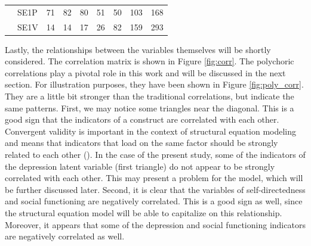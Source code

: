 \documentclass[11pt]{article}
\begin{document}
\begin{table}[h!]
{\begin{tabular}{|l|l|lllllll|}
                                    & SE1P                           & \multicolumn{1}{l|}{71}         & \multicolumn{1}{l|}{82}         & \multicolumn{1}{l|}{80}         & \multicolumn{1}{l|}{51}         & \multicolumn{1}{l|}{50}         & \multicolumn{1}{l|}{103}       & 168       \\ \cline{2-9} 
                                    & SE1V                           & \multicolumn{1}{l|}{14}         & \multicolumn{1}{l|}{14}         & \multicolumn{1}{l|}{17}         & \multicolumn{1}{l|}{26}         & \multicolumn{1}{l|}{82}         & \multicolumn{1}{l|}{159}       & 293       \\ \hline
\end{tabular}
}
\end{table}

Lastly, the relationships between the variables themselves will be shortly
considered. The correlation matrix is shown in Figure \ref{fig:corr}. The
polychoric correlations play a pivotal role in this work and will be discussed
in the next section. For illustration purposes, they have been shown in Figure
\ref{fig:poly_corr}. They are a little bit stronger than the traditional
correlations, but indicate the same patterns.
%
First, we may notice some triangles near the diagonal. This is a good sign that
the indicators of a construct are correlated with each other. Convergent
validity is important in the context of structural equation modeling and means
that indicators that load on the same factor should be strongly related to each
other (\cite{brown2015}). In the case of the present study, some of the
indicators of the depression latent variable (first triangle) do not appear to
be strongly correlated with each other. This may present a problem for the
model, which will be further discussed later. Second, it is clear that the
variables of self-directedness and social functioning are negatively correlated.
This is a good sign as well, since the structural equation model will be able to
capitalize on this relationship. Moreover, it appears that some of the
depression and social functioning indicators are negatively correlated as well.
\end{document}
